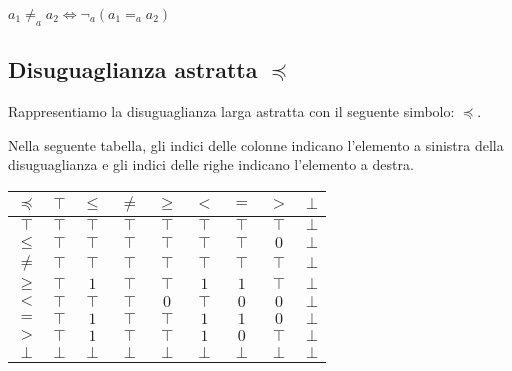 \documentclass[a4paper, 12pt, oneside,fleqn]{book}
\begin{document}
\begin{center}
	$ a_1 \neq _a a_2 \iff \neg _a (a_1 =_a a_2) $
\end{center}

\subsection{Disuguaglianza astratta $\preceq$}

Rappresentiamo la disuguaglianza larga astratta con il seguente simbolo: $\preceq$.

Nella seguente tabella, gli indici delle colonne indicano l'elemento a sinistra della disuguaglianza e gli indici delle righe indicano l'elemento a destra.

\begin{center}
	\begin{tabular}{| c | c | c | c | c | c | c | c | c | }
		\hline
		$\preceq$ & $\top$ & $\leq$ & $\neq$ & $\geq$ & $<$ & $=$ & $>$ & $\bot$ \\
		\hline
		$\top$ & $\top$ & $\top$ & $\top$ & $\top$ & $\top$ & $\top$ & $\top$ & $\bot$\\
		\hline
		$\leq$ & $\top$ & $\top$ & $\top$ & $\top$ & $\top$ & $\top$ & $0$ & $\bot$\\
		\hline
		$\neq$ & $\top$ & $\top$ & $\top$ & $\top$ & $\top$ & $\top$ & $\top$ & $\bot$\\
		\hline
		$\geq$ & $\top$ & $1$ & $\top$ & $\top$ & $1$ & $1$ & $\top$ & $\bot$ \\
		\hline
		$<$ & $\top$ & $\top$ & $\top$ & $0$ & $\top$ & $0$ & $0$ & $\bot$\\
		\hline
		$=$ & $\top$ & $1$ & $\top$ & $\top$ & $1$ & $1$ & $0$ & $\bot$ \\
		\hline
		$>$ & $\top$ & $1$ & $\top$ & $\top$ & $1$ & $0$ & $\top$ & $\bot$ \\
		\hline
		$\bot$ & $\bot$ & $\bot$ & $\bot$ & $\bot$ & $\bot$ & $\bot$ & $\bot$ & $\bot$\\
		\hline
	\end{tabular}
\end{center}
\end{document}
